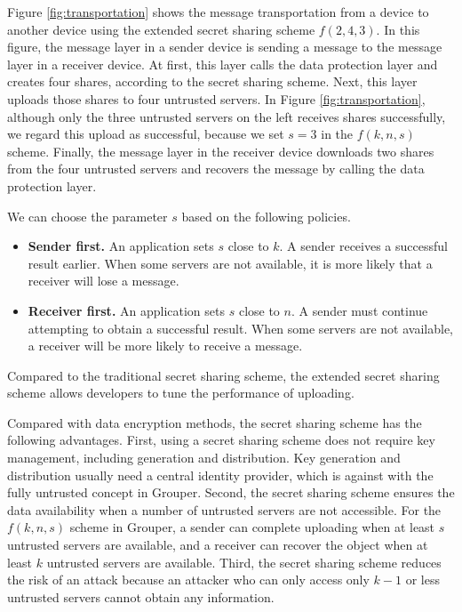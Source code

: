 \documentclass[a4paper,11pt]{report}
\begin{document}
Figure \ref{fig:transportation} shows the message transportation from a device to another device using the extended secret sharing scheme $f(2, 4, 3)$.
In this figure, the message layer in a sender device is sending a message to the message layer in a receiver device.
At first, this layer calls the data protection layer and creates four shares, according to the secret sharing scheme.
Next, this layer uploads those shares to four untrusted servers.
In Figure \ref{fig:transportation}, although only the three untrusted servers on the left receives shares successfully, we regard this upload as successful, because we set $s = 3$ in the $f(k, n, s)$ scheme.
Finally, the message layer in the receiver device downloads two shares from the four untrusted servers and recovers the message by calling the data protection layer.

We can choose the parameter $s$ based on the following policies.

\begin{itemize}[leftmargin=7mm]
	\setlength{\itemsep}{1pt}
	\setlength{\parskip}{0pt}
	\setlength{\parsep}{0pt}
	\item \textbf{Sender first.} 
	An application sets $s$ close to $k$. 
	A sender receives a successful result earlier.
	When some servers are not available, it is more likely that a receiver will lose a message.
	\item \textbf{Receiver first.}
	An application sets $s$ close to $n$. 
	A sender must continue attempting to obtain a successful result.
	When some servers are not available, a receiver will be more likely to receive a message.
\end{itemize}

Compared to the traditional secret sharing scheme, the extended secret sharing scheme allows developers to tune the performance of uploading.

Compared with data encryption methods, the secret sharing scheme has the following advantages.
First, using a secret sharing scheme does not require key management, including generation and distribution.
Key generation and distribution usually need a central identity provider, which is against with the fully untrusted concept in Grouper.
Second, the secret sharing scheme ensures the data availability when a number of untrusted servers are not accessible.
For the $f(k, n, s)$ scheme in Grouper, a sender can complete uploading when at least $s$ untrusted servers are available, and a receiver can recover the object when at least $k$ untrusted servers are available.
Third, the secret sharing scheme reduces the risk of an attack because an attacker who can only access only $k-1$ or less untrusted servers cannot obtain any information.
\end{document}
